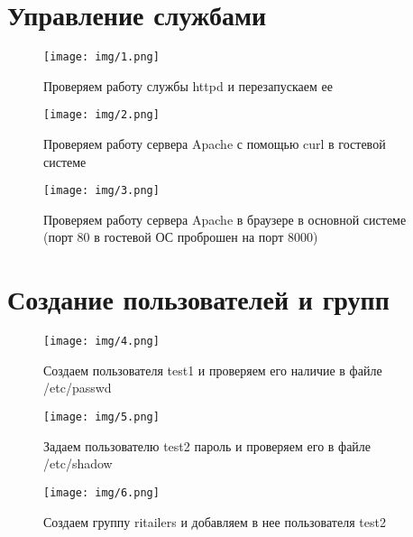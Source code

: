 \documentclass{gost}
\begin{document}
	\gostTitlePage

	\section{Управление службами}
		\begin{figure}[H]
			\texttt{[image: img/1.png]}
			\caption{Проверяем работу службы httpd и перезапускаем ее}
		\end{figure}

		\begin{figure}[H]
			\texttt{[image: img/2.png]}
			\caption{Проверяем работу сервера Apache с помощью curl в гостевой системе}
		\end{figure}

		\begin{figure}[H]
			\texttt{[image: img/3.png]}
			\caption{Проверяем работу сервера Apache в браузере в основной системе
			(порт 80 в гостевой ОС проброшен на порт 8000)}
		\end{figure}

	\section{Создание пользователей и групп}
		\begin{figure}[H]
			\texttt{[image: img/4.png]}
			\caption{Создаем пользователя test1 и проверяем его наличие в файле
			/etc/passwd}
		\end{figure}

		\begin{figure}[H]
			\texttt{[image: img/5.png]}
			\caption{Задаем пользователю test2 пароль и проверяем его в файле
			/etc/shadow}
		\end{figure}

		\begin{figure}[H]
			\texttt{[image: img/6.png]}
			\caption{Создаем группу ritailers и добавляем в нее пользователя test2}
		\end{figure}
\end{document}
